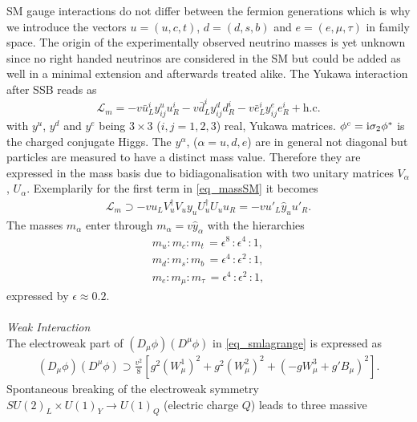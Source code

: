 SM gauge interactions do not differ between the fermion generations which is why we introduce the vectors
$u=(u,c,t)$, $d=(d,s,b)$ and $e=(e,\mu,\tau)$ in family space. The origin of the experimentally observed neutrino masses is yet unknown since
no right handed neutrinos are considered in the SM but could be added as well in a minimal extension and afterwards treated alike.
The Yukawa interaction after SSB reads as
\begin{equation}
 \mathcal{L}_m = -v \bar u^i_L y^u_{ij}u^i_R -v \bar d^i_Ly^d_{ij} d^i_R -v \bar e^i_Ly^e_{ij} e^i_R + \text{h.c.}
 \label{eq_massSM}
\end{equation}
with $y^u$, $y^d$ and $y^e$ being $3\times 3$ ($i,j=1,2,3$) real, Yukawa matrices. $\phi^c = \text{i}\sigma_2\phi^*$ is the charged conjugate 
Higgs. 
The $y^\alpha$, ($\alpha=u,d,e$) are in general not diagonal but particles are measured to have a distinct mass value. Therefore they are expressed
in the mass basis due to bidiagonalisation with two unitary matrices $V_\alpha$, $U_\alpha$. Exemplarily for the first term in \eqref{eq_massSM}
it becomes
\begin{align}
 \mathcal{L}_m \supset -v u_L V_u^\dagger V_u y_u U^\dagger_u U_u u_R = -v u'_L \hat{y}_u u'_R.
 \label{eq_diracmass}
\end{align}
The masses $m_\alpha$ enter through $m_\alpha = v\hat{y}_\alpha$ with the hierarchies \cite{0712.1419}
\begin{equation}
\begin{aligned}
 m_u:m_c:m_t\,=\epsilon^8\,:\epsilon^4\,:1,\\
 m_d:m_s:m_b\,=\epsilon^4\,:\epsilon^2\,:1,\\
 m_e:m_\mu:m_\tau\, = \epsilon^4\,:\epsilon^2\,:1,
\end{aligned}
 \label{eq_masshierarchy}
\end{equation}
expressed by $\epsilon\approx0.2$. 
\\ \\ \textit{Weak Interaction}\\
\noindent The electroweak part of $\left(D_\mu\phi\right)\left(D^\mu\phi\right)$ in \eqref{eq_smlagrange} is expressed as
\begin{align}
 \left(D_\mu\phi\right)\left(D^\mu\phi\right) \supset \frac{v^2}{8} \left[g^2(W^1_\mu)^2 + g^2(W^2_\mu)^2 + (-gW^3_\mu+g'B_\mu)^2\right].
\end{align}
Spontaneous breaking of the electroweak symmetry $SU(2)_L\times U(1)_Y\rightarrow U(1)_Q$ (electric charge $Q$) leads to three massive
